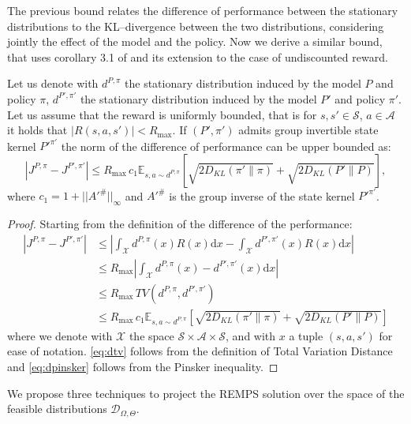 The previous bound relates the difference of performance between the stationary distributions to the KL--divergence between the two distributions, considering jointly the effect of the model and the policy. Now we derive a similar bound, that uses corollary 3.1 of \citep{cmdp} and its extension to the case of undiscounted reward.
\begin{theorem}
Let us denote with $d^{P,\pi}$ the stationary distribution induced by the model $P$ and policy $\pi$, $d^{P',\pi'}$ the stationary distribution induced by the model $P'$ and policy $\pi'$. Let us assume that the reward is uniformly bounded, that is for $s, s' \in \mathcal{S}$, $a \in \mathcal{A}$ it holds that $|R(s,a,s')| < R_{\max}$. If $(P',\pi')$ admits group invertible state kernel $P'^{\pi'}$ the norm of the difference of performance can be upper bounded as:
\begin{equation}
	|J^{P,\pi} - J^{P',\pi'}| \le R_{\max} \, c_1 \mathbb{E}_{s,a \sim d^{P,\pi}} \left[ \sqrt{2D_{KL}(\pi'\|\pi)} + \sqrt{2D_{KL}(P'\|P)} \right],
\end{equation}
where $c_1 = 1 + ||A'^{\#}||_{\infty}$ and $A'^{\#}$ is the group inverse of the state kernel $P'^{\pi'}$.
\end{theorem}
\begin{proof}
	Starting from the definition of the difference of the performance:
\begin{align}
|J^{P,\pi} - J^{P',\pi'}| &  \le  \left| \int_{\mathcal{X}} d^{P,\pi}(x) R(x) \mathrm{d}x - \int_{\mathcal{X}} d^{P',\pi'}(x) R(x) \mathrm{d}x \right| \\
& \le  R_{\max} \left| \int_{\mathcal{X}} d^{P,\pi}(x) - d^{P', \pi'}(x)\mathrm{d}x \right| \\
& \le R_{\max} \, TV(d^{P,\pi}, d^{P', \pi'}) \label{eq:dtv} \\
& \le R_{\max} \, c_1 \mathbb{E}_{s,a \sim d^{P,\pi}} \left[ \sqrt{2D_{KL}(\pi'\|\pi)} + \sqrt{2D_{KL}(P'\|P)} \right] \label{eq:dpinsker}
	\end{align}
where we denote with $\mathcal{X}$ the space $\mathcal{S}\times \mathcal{A}\times  \mathcal{S}$, and with $x$ a tuple $(s,a,s')$ for ease of notation. \cref{eq:dtv} follows from the definition of Total Variation Distance and \cref{eq:dpinsker} follows from the Pinsker inequality.
\end{proof}
We propose three techniques to project the REMPS solution over the space of the feasible distributions $\mathcal{D}_{\Omega , \Theta}$.


